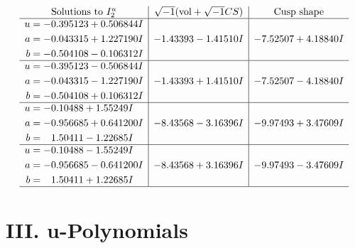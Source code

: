 \documentclass[1p]{elsarticle_modified}
\theoremstyle{definition}
\newcommand{\I}{\sqrt{-1}}
\begin{document}
$$\begin{array}{c|c|c}  
\text{Solutions to }I^u_{2}& \I (\text{vol} + \sqrt{-1}CS) & \text{Cusp shape}\\
 \hline 
\begin{aligned}
u &= -0.395123 + 0.506844 I \\
a &= -0.043315 + 1.227190 I \\
b &= -0.504108 - 0.106312 I\end{aligned}
 & -1.43393 - 1.41510 I & -7.52507 + 4.18840 I \\ \hline\begin{aligned}
u &= -0.395123 - 0.506844 I \\
a &= -0.043315 - 1.227190 I \\
b &= -0.504108 + 0.106312 I\end{aligned}
 & -1.43393 + 1.41510 I & -7.52507 - 4.18840 I \\ \hline\begin{aligned}
u &= -0.10488 + 1.55249 I \\
a &= -0.956685 + 0.641200 I \\
b &= \phantom{-}1.50411 - 1.22685 I\end{aligned}
 & -8.43568 - 3.16396 I & -9.97493 + 3.47609 I \\ \hline\begin{aligned}
u &= -0.10488 - 1.55249 I \\
a &= -0.956685 - 0.641200 I \\
b &= \phantom{-}1.50411 + 1.22685 I\end{aligned}
 & -8.43568 + 3.16396 I & -9.97493 - 3.47609 I\\
 \hline 
 \end{array}$$\newpage
\newpage\renewcommand{\arraystretch}{1}
\centering \section*{ III. u-Polynomials}
\end{document}
